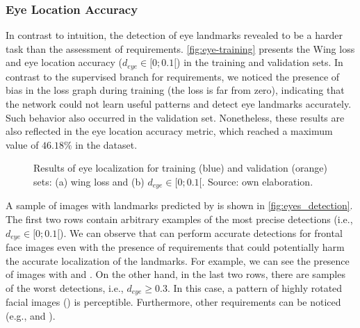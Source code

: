 
 
\subsubsection{Eye Location Accuracy} \label{sec:eye_location_acc}
 
In contrast to intuition, the detection of eye landmarks revealed to be a harder task than the assessment of \icao requirements. \autoref{fig:eye-training} presents the Wing loss and eye location accuracy ($d_{eye} \in [0;0.1[$) in the training and validation sets. In contrast to the supervised branch for requirements, we noticed the presence of bias in the loss graph during training (the loss is far from zero), indicating that the network could not learn useful patterns and detect eye landmarks accurately. Such behavior also occurred in the validation set. Nonetheless, these results are also reflected in the eye location accuracy metric, which reached a maximum value of $46.18\%$ in the \adhoc dataset. 
 
\begin{figure}[htb]
\centering
{}
\hfill
{}
\caption{Results of eye localization for training (blue) and validation (orange) sets: (a) wing loss and (b) $d_{eye} \in [0;0.1[$. Source: own elaboration.}
\label{fig:eye-training}
\end{figure}
 
A sample of images with landmarks predicted by \methodname is shown in \autoref{fig:eyes_detection}. The first two rows contain arbitrary examples of the most precise detections (i.e., $d_{eye} \in [0;0.1[$). We can observe that \methodname can perform accurate detections for frontal face images even with the presence of requirements that could potentially harm the accurate localization of the landmarks. For example, we can see the presence of images with \framecoveringeyes and \toodarklight. On the other hand, in the last two rows, there are samples of the worst detections, i.e., $d_{eye} \geq 0.3$. In this case, a pattern of highly rotated facial images (\rollpitchyaw) is perceptible. Furthermore, other requirements can be noticed (e.g., \blurred and \framestooheavy).
 
